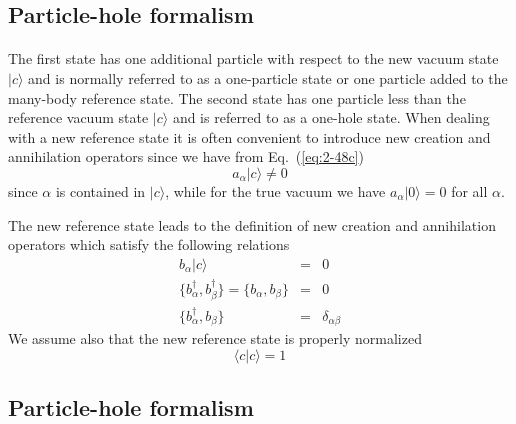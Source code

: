 \documentclass[%
twoside,                 %
final,                   %
10pt]{article}
\begin{document}
\subsection{Particle-hole formalism}

\paragraph{}
The first state has one additional particle with respect to the new vacuum state
$|c\rangle $  and is normally referred to as a one-particle state or one particle added to the 
many-body reference state. 
The second state has one particle less than the reference vacuum state  $|c\rangle $ and is referred to as
a one-hole state. 
When dealing with a new reference state it is often convenient to introduce 
new creation and annihilation operators since we have 
from Eq.~(\ref{eq:2-48c})
\begin{equation}
	a_\alpha |c\rangle  \neq 0 \label{eq:2-49}
\end{equation}
since  $\alpha$ is contained  in $|c\rangle $, while for the true vacuum we have 
$a_\alpha |0\rangle  = 0$ for all $\alpha$.

The new reference state leads to the definition of new creation and annihilation operators
which satisfy the following relations
\begin{eqnarray}
	b_\alpha |c\rangle  &=& 0 \label{eq:2-50a} \\
	\{b_\alpha^\dagger , b_\beta^\dagger \} = \{b_\alpha , b_\beta \} &=& 0 \nonumber  \\
	\{b_\alpha^\dagger , b_\beta \} &=& \delta_{\alpha \beta} \label{eq:2-50c}
\end{eqnarray}
We assume also that the new reference state is properly normalized
\begin{equation}
	\langle c | c \rangle = 1 \label{eq:2-51}
\end{equation}



\subsection{Particle-hole formalism}

\end{document}
